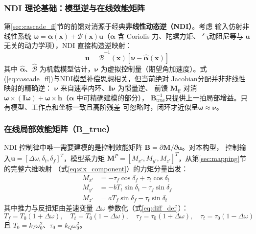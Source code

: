 \subsubsection{NDI 理论基础：模型逆与在线效能矩阵}

第\ref{sec:cascade_ff}节的前馈对消源于经典\textbf{非线性动态逆（NDI）}。考虑
输入仿射非线性系统 $\dot{\boldsymbol{\omega}} = \boldsymbol{\alpha}(\mathbf{x}) +
\mathcal{B}(\mathbf{x})\mathbf{u}$（$\boldsymbol{\alpha}$ 含 Coriolis 力、陀螺力矩、
气动阻尼等与 $\mathbf{u}$ 无关的动力学项），NDI 直接构造逆映射\cite{stevens2015aircraft}：
\begin{equation}
    \mathbf{u} = \hat{\mathcal{B}}^{-1}(\mathbf{x})\left[\boldsymbol{\nu}
        - \hat{\boldsymbol{\alpha}}(\mathbf{x})\right]
    \label{eq:ndi_law}
\end{equation}
其中 $\hat{\boldsymbol{\alpha}}$、$\hat{\mathcal{B}}$ 为机载模型估计，$\boldsymbol{\nu}$
为虚拟控制量（期望角加速度）。式(\ref{eq:cascade_ff})与NDI模型补偿思想相关，但当前绝对
Jacobian分配并非非线性映射的精确逆：
$\boldsymbol{\nu}$ 来自速率内环、$\mathbf{I}\boldsymbol{\nu}$ 为惯量逆、
前馈 $\mathbf{M}_{\mathrm{ff}}$ 对消 $\boldsymbol{\omega}\times(\mathbf{I}\boldsymbol{\omega})
+\boldsymbol{\omega}\times\mathbf{h}$（$\boldsymbol{\alpha}$ 中可精确建模的部分），
$\mathbf B_{\mathrm{true}}^{-1}$只提供上一拍局部增益。只有模型、工作点和坐标一致且高阶残差
可忽略时，闭环才近似呈$\dot{\boldsymbol\omega}\approx\boldsymbol\nu$。

\subsubsection{在线局部效能矩阵（B\_true）}
\label{sec:cascade_Btrue}

NDI 控制律中唯一需要建模的是控制效能矩阵
$\mathbf{B}=\partial\mathbf{M}/\partial\mathbf{u}$。对本构型，
控制输入$\mathbf u=[\Delta\omega,\delta_t,\delta_f]^T$，模型系力矩
$\mathbf M^P=[M_{x'},M_{y'},M_{z'}]^T$，从第\ref{sec:mapping}节的完整六维映射
（式\ref{eq:six_component}）的力矩分量出发：
\begin{equation}
    \begin{aligned}
        M_{x'} &= -\tau_f \cos\delta_f + \tau_t \cos\delta_t \\
        M_{y'} &= -b T_t \sin\delta_t - \tau_f \sin\delta_f \\
        M_{z'} &= a T_f \sin\delta_f - \tau_t \sin\delta_t
    \end{aligned}
    \label{eq:moment_full_nonlinear}
\end{equation}
其中推力与反扭矩由差速变量 $\Delta\omega$ 参数化（式\ref{eq:diff_def}）：
\begin{equation}
    T_f = T_0(1+\Delta\omega), \quad T_t = T_0(1-\Delta\omega), \quad
    \tau_f = \tau_0(1+\Delta\omega), \quad \tau_t = \tau_0(1-\Delta\omega)
    \label{eq:diff_thrust_torque}
\end{equation}
且 $T_0=k_T\omega_0^2$、$\tau_0=k_Q\omega_0^2$。


